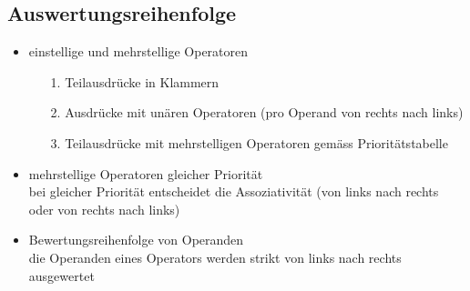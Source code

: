 \documentclass[a4paper,10pt]{article}
\begin{document}
\subsection{Auswertungsreihenfolge}
\begin{itemize}
	\item einstellige und mehrstellige Operatoren
		\begin{itemize}
			\item[1.] Teilausdr\"ucke in Klammern
			\item[2.] Ausdr\"ucke mit un\"aren Operatoren (pro Operand von rechts nach links)
			\item[3.] Teilausdr\"ucke mit mehrstelligen Operatoren gem\"ass Priorit\"atstabelle
		\end{itemize}
	\item mehrstellige Operatoren gleicher Priorit\"at \\
		bei gleicher Priorit\"at entscheidet die Assoziativit\"at (von links nach rechts oder von rechts nach links)
	\item Bewertungsreihenfolge von Operanden \\
		die Operanden eines Operators werden strikt von links nach rechts ausgewertet
\end{itemize}
\end{document}
